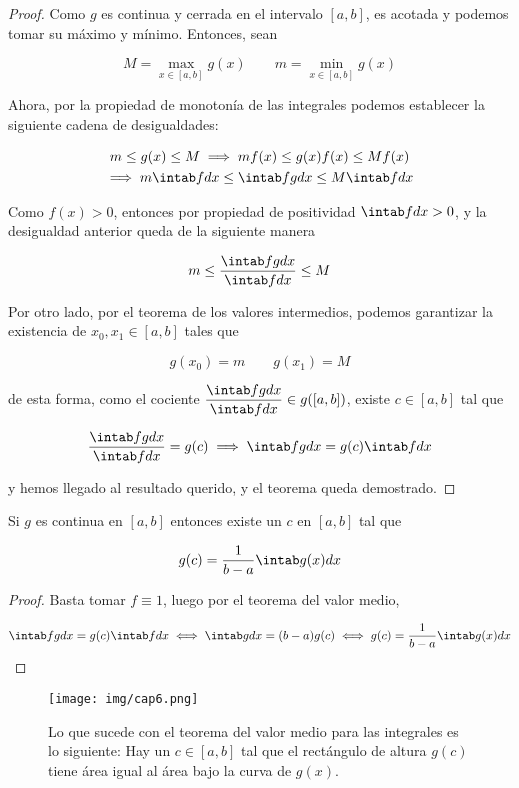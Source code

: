 \begin{proof}
    Como $g$ es continua y cerrada en el intervalo $[a,b]$, es acotada y podemos tomar su máximo y mínimo. Entonces, sean
    
    \[
    M = \max_{x \in [a,b]} g(x) \qquad m = \min_{x \in [a,b]} g(x)
    \]
    
    Ahora, por la propiedad de monotonía de las integrales podemos establecer la siguiente cadena de desigualdades:
    
    \begin{gather*}
        m \leq g(x) \leq M \implies mf(x) \leq g(x)f(x) \leq Mf(x) \\
        \implies m\intab fdx \leq \intab fgdx \leq M\intab fdx
    \end{gather*}
    
    Como $f(x) > 0$, entonces por propiedad de positividad $\intab fdx > 0$, y la desigualdad anterior queda de la siguiente manera
    
    \begin{equation}\label{eq:cocint}
        m \leq \dfrac{\intab fgdx}{\intab fdx} \leq M
    \end{equation}
    
    Por otro lado, por el teorema de los valores intermedios, podemos garantizar la existencia de $x_0, x_1 \in [a,b]$ tales que
    
    \[
    g(x_0) = m \qquad g(x_1) = M
    \]
    
    \noindent de esta forma, como el cociente $\displaystyle \dfrac{\intab fgdx}{\intab fdx} \in g([a,b])$, existe $c \in [a,b]$ tal que
    
    \[
    \dfrac{\intab fgdx}{\intab fdx} = g(c) \implies \intab fgdx = g(c)\intab fdx
    \]
    
    \noindent y hemos llegado al resultado querido, y el teorema queda demostrado.
\end{proof}

\begin{cor}
    Si $g$ es continua en $[a,b]$ entonces existe un $c$ en $[a,b]$ tal que
    
    \[
    g(c) = \frac{1}{b-a} \intab g(x)dx
    \]
\end{cor}

\begin{proof}
    Basta tomar $f \equiv 1$, luego por el teorema del valor medio,
    
    \[
    \intab fgdx = g(c)\intab fdx \iff \intab gdx = (b-a)g(c) \iff g(c) = \frac{1}{b-a} \intab g(x)dx
    \]
\end{proof}

\begin{figure}
    \centering
    \texttt{[image: img/cap6.png]}
    \caption{\footnotesize Lo que sucede con el teorema del valor medio para las integrales es lo siguiente: Hay un $c \in [a,b]$ tal que el rectángulo de altura $g(c)$ tiene área igual al área bajo la curva de $g(x)$.} 
    \label{fig:my_label}
\end{figure}
